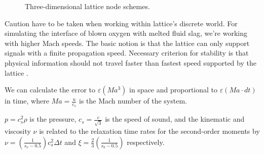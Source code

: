 \begin{figure}[!ht]
	\centering
	\qquad
	\caption{Three-dimensional lattice node schemes.}
	\label{fig:lattice-node-schemes}
\end{figure}


Caution have to be taken when working within lattice's discrete world. For simulating the interface of blown oxygen with melted fluid slag, we're working with higher Mach speeds. The basic notion is that the lattice can only support signals with a finite propagation speed. Necessary criterion for stability is that physical information should not travel faster than fastest speed supported by the lattice \cite{succi2001lattice}.

We can calculate the error to $\varepsilon(Ma^3)$ in space and proportional to $\varepsilon (Ma \cdot dt)$ in time, where $Ma = \frac{u}{c_s}$ is the Mach number of the system.

$p = c_s^2 \rho$ is the pressure, $c_s = \frac{c}{\sqrt{3}}$ is the speed of sound, and the kinematic and viscosity $\nu$ is related to the relaxation time rates for the second-order moments by $\nu = \left(\frac{1}{s_v - 0.5}\right) c_s^2 \Delta t$ and $\xi = \frac{2}{3}\left(\frac{1}{s_b - 0.5}\right)$ respectively.


